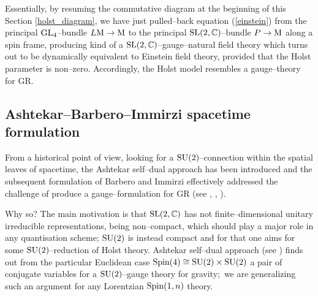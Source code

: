 Essentially, by resuming the commutative diagram at the beginning of this Section \ref{holst_diagram}, we have just pulled--back equation (\ref{einstein}) %
from the principal $\text{\normalfont GL}_4$--bundle $L\text{\normalfont M}\to\text{\normalfont M}$ to the principal $\text{\normalfont SL}(2,\mathbb{C})$--bundle $P\to\text{\normalfont M}$ along a spin frame, producing kind of a $\text{\normalfont SL}(2,\mathbb{C})$--gauge--natural field theory which turns out to be dynamically equivalent to Einstein field theory, provided that the Holst parameter is non--zero. Accordingly, the Holst model resembles a gauge--theory for GR.



\subsection{Ashtekar--Barbero--Immirzi spacetime formulation}\label{BI_red}


{From a historical point of view, looking for a $\text{\normalfont SU}(2)$--connection within the spatial leaves of spacetime, the Ashtekar self--dual approach has been introduced and the subsequent formulation of Barbero and Immirzi effectively addressed the challenge of produce a gauge--formulation for GR (see \cite{OF1}, \cite{FFR1}, \cite{FFR2}).}

{Why so? The main motivation is that $\text{\normalfont SL}(2,\mathbb{C})$ has not finite--dimensional unitary irreducible representations, being non--compact, which should play a major role in any quantisation scheme; $\text{\normalfont SU}(2)$ is instead compact and for that one aims for some $\text{\normalfont SU}(2)$--reduction of Holst theory. Ashtekar self--dual approach (see \cite{FF}) finds out from the particular Euclidean case $\text{\normalfont Spin}(4)\cong\text{\normalfont SU}(2)\times\text{\normalfont SU}(2)$ a pair of conjugate variables for a $\text{\normalfont SU}(2)$--gauge theory for gravity;\, we are generalizing such an argument for any Lorentzian $\text{\normalfont Spin}(1,n)$ theory.}

